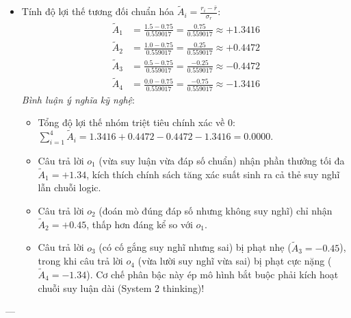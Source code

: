 \begin{itemize}
  \item[3)] Tính độ lợi thế tương đối chuẩn hóa $\widetilde{A}_i = \frac{r_i - \bar{r}}{\sigma_r}$:
  \begin{align*}
  \widetilde{A}_1 &= \frac{1.5 - 0.75}{0.559017} = \frac{0.75}{0.559017} \approx \mathbf{+1.3416} \\
  \widetilde{A}_2 &= \frac{1.0 - 0.75}{0.559017} = \frac{0.25}{0.559017} \approx \mathbf{+0.4472} \\
  \widetilde{A}_3 &= \frac{0.5 - 0.75}{0.559017} = \frac{-0.25}{0.559017} \approx \mathbf{-0.4472} \\
  \widetilde{A}_4 &= \frac{0.0 - 0.75}{0.559017} = \frac{-0.75}{0.559017} \approx \mathbf{-1.3416}
  \end{align*}
  \textit{Bình luận ý nghĩa kỹ nghệ}:
  \begin{itemize}
    \item Tổng độ lợi thế nhóm triệt tiêu chính xác về 0: $\sum_{i=1}^4 \widetilde{A}_i = 1.3416 + 0.4472 - 0.4472 - 1.3416 = 0.0000$.
    \item Câu trả lời $o_1$ (vừa suy luận vừa đáp số chuẩn) nhận phần thưởng tối đa $\widetilde{A}_1 = +1.34$, kích thích chính sách tăng xác suất sinh ra cả thẻ suy nghĩ lẫn chuỗi logic.
    \item Câu trả lời $o_2$ (đoán mò đúng đáp số nhưng không suy nghĩ) chỉ nhận $\widetilde{A}_2 = +0.45$, thấp hơn đáng kể so với $o_1$.
    \item Câu trả lời $o_3$ (có cố gắng suy nghĩ nhưng sai) bị phạt nhẹ ($\widetilde{A}_3 = -0.45$), trong khi câu trả lời $o_4$ (vừa lười suy nghĩ vừa sai) bị phạt cực nặng ($\widetilde{A}_4 = -1.34$). Cơ chế phân bậc này ép mô hình bắt buộc phải kích hoạt chuỗi suy luận dài (System 2 thinking)!
  \end{itemize}
\end{itemize}

---

